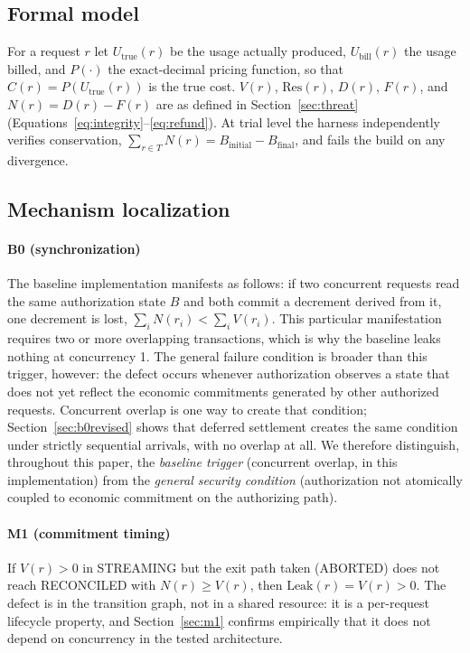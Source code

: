 \documentclass[manuscript,review,anonymous]{acmart}
\begin{document}
\subsection{Formal model}
For a request $r$ let $U_{\text{true}}(r)$ be the usage actually produced,
$U_{\text{bill}}(r)$ the usage billed, and $P(\cdot)$ the exact-decimal pricing function,
so that $C(r) = P(U_{\text{true}}(r))$ is the true cost. $V(r)$, $\mathrm{Res}(r)$,
$D(r)$, $F(r)$, and $N(r) = D(r) - F(r)$ are as defined in Section~\ref{sec:threat}
(Equations~\ref{eq:integrity}--\ref{eq:refund}). At trial level the harness independently
verifies conservation, $\sum_{r \in T} N(r) = B_{\text{initial}} - B_{\text{final}}$, and
fails the build on any divergence.

\subsection{Mechanism localization}
\paragraph{B0 (synchronization)}
The baseline implementation manifests as follows: if two concurrent requests read the
same authorization state $B$ and both commit a decrement derived from it, one decrement
is lost, $\sum_i N(r_i) < \sum_i V(r_i)$. This particular manifestation requires two or
more overlapping transactions, which is why the baseline leaks nothing at concurrency 1.
The general failure condition is broader than this trigger, however: the defect occurs
whenever authorization observes a state that does not yet reflect the economic
commitments generated by other authorized requests. Concurrent overlap is one way to
create that condition; Section~\ref{sec:b0revised} shows that deferred settlement creates
the same condition under strictly sequential arrivals, with no overlap at all. We
therefore distinguish, throughout this paper, the \emph{baseline trigger} (concurrent
overlap, in this implementation) from the \emph{general security condition}
(authorization not atomically coupled to economic commitment on the authorizing path).

\paragraph{M1 (commitment timing)}
If $V(r) > 0$ in STREAMING but the exit path taken (ABORTED) does not reach RECONCILED
with $N(r) \ge V(r)$, then $\mathrm{Leak}(r) = V(r) > 0$. The defect is in the transition
graph, not in a shared resource: it is a per-request lifecycle property, and
Section~\ref{sec:m1} confirms empirically that it does not depend on concurrency in the
tested architecture.
\end{document}
